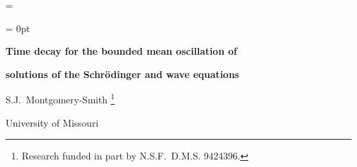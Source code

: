 






%




\magnification=

\overfullrule = 0pt

\def\normo#1{\left\|#1\right\|}
\def\modo#1{\left|#1\right|}
\def\snormo#1{\mathopen\|#1\mathclose\|}
\def\smodo#1{\mathopen|#1\mathclose|}
\def\angleo#1{\langle#1\rangle}
\def\Im{\mathop{\hbox{\rm Im}}}
\def\Re{\mathop{\hbox{\rm Re}}}
\def\sgn{\mathop{\hbox{\rm sgn}}}
\def\R{{\bf R}}
\def\BMO{{\rm BMO}}
\def\assert#1\par{\smallskip}

\centerline{\bf Time decay for the bounded mean oscillation of}
\centerline{\bf solutions of the Schr\"odinger and wave equations}

\bigskip

\centerline{S.J.~Montgomery-Smith%
\footnote*{Research funded in part by N.S.F.\ D.M.S. 9424396.}}
\centerline{University of Missouri}

